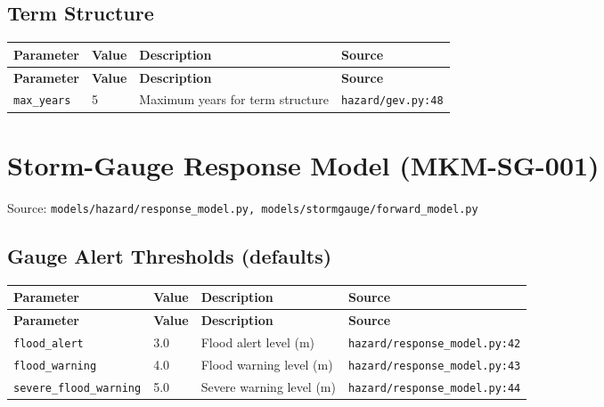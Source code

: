 \documentclass[11pt,a4paper]{article}
\begin{document}
\subsection{Term Structure}

\begin{longtable}{p{4cm}p{4cm}p{5.5cm}p{3.5cm}}
    \toprule
    \textbf{Parameter} & \textbf{Value} & \textbf{Description} & \textbf{Source} \\
    \midrule
    \endfirsthead
    \toprule
    \textbf{Parameter} & \textbf{Value} & \textbf{Description} & \textbf{Source} \\
    \midrule
    \endhead
    \bottomrule
    \endfoot
    \texttt{max\_years} & 5 & Maximum years for term structure & {\scriptsize \texttt{hazard/gev.py:48}} \\
\end{longtable}

\clearpage

\section{Storm-Gauge Response Model (MKM-SG-001)}

Source: \texttt{models/hazard/response\_model.py, models/stormgauge/forward\_model.py}

\subsection{Gauge Alert Thresholds (defaults)}

\begin{longtable}{p{4cm}p{4cm}p{5.5cm}p{3.5cm}}
    \toprule
    \textbf{Parameter} & \textbf{Value} & \textbf{Description} & \textbf{Source} \\
    \midrule
    \endfirsthead
    \toprule
    \textbf{Parameter} & \textbf{Value} & \textbf{Description} & \textbf{Source} \\
    \midrule
    \endhead
    \bottomrule
    \endfoot
    \texttt{flood\_alert} & 3.0 & Flood alert level (m) & {\scriptsize \texttt{hazard/response\_model.py:42}} \\
    \texttt{flood\_warning} & 4.0 & Flood warning level (m) & {\scriptsize \texttt{hazard/response\_model.py:43}} \\
    \texttt{severe\_flood\_warning} & 5.0 & Severe warning level (m) & {\scriptsize \texttt{hazard/response\_model.py:44}} \\
\end{longtable}
\end{document}
